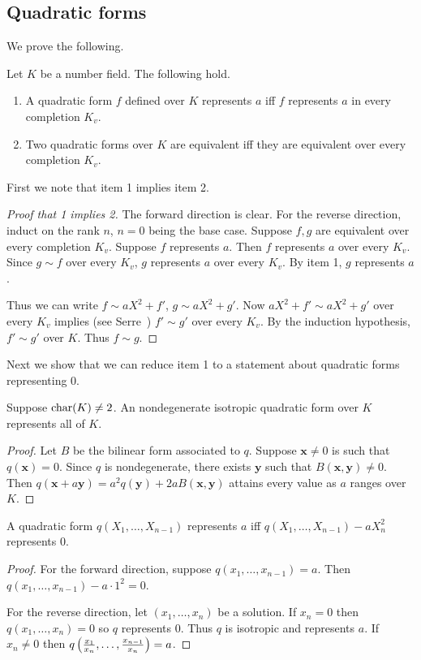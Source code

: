\subsection{Quadratic forms}
We prove the following.
\begin{thm}
Let $K$ be a number field. The following hold.
\begin{enumerate}
\item A quadratic form $f$ defined over $K$ represents $a$ iff $f$ represents $a$ in every completion $K_v$.
\item Two quadratic forms over $K$ are equivalent iff they are equivalent over every completion $K_v$.
\end{enumerate}
\end{thm}
First we note that item 1 implies item 2.
\begin{proof}[Proof that 1 implies 2]
The forward direction is clear. For the reverse direction, induct on the rank $n$, $n=0$ being the base case. Suppose $f,g$ are equivalent over every completion $K_v$. Suppose $f$ represents $a$. Then $f$ represents $a$ over every $K_v$. Since $g\sim f$ over every $K_v$, $g$ represents $a$ over every $K_v$. By item 1, $g$ represents $a$.

Thus we can write $f\sim aX^2+f'$, $g\sim aX^2+g'$. Now $aX^2+f'\sim aX^2+g'$ over every $K_v$ implies (see Serre~\cite[IV.1.7, Prop. 4]{Se73}) $f'\sim g'$ over every $K_v$. By the induction hypothesis, $f'\sim g'$ over $K$. Thus $f\sim g$.
\end{proof}
Next we show that we can reduce item 1 to a statement about quadratic forms representing 0. 
\begin{lem}
Suppose $\operatorname{char}(K)\ne 2$. 
An nondegenerate isotropic quadratic form over $K$ represents all of $K$.
\end{lem}
\begin{proof}
Let $B$ be the bilinear form associated to $q$. 
Suppose $\mathbf x\ne 0$ is such that $q(\mathbf x)=0$. Since $q$ is nondegenerate, there exists $\mathbf y$ such that $B(\mathbf x,\mathbf y)\ne 0$. Then $q(\mathbf x+a\mathbf y)=a^2 q(\mathbf y)+2aB(\mathbf x,\mathbf y)$ attains every value as $a$ ranges over $K$.
\end{proof}
\begin{lem}
A quadratic form $q(X_1,\ldots, X_{n-1})$ represents $a$ iff $q(X_1,\ldots, X_{n-1})-aX_n^2$ represents 0.
\end{lem}
\begin{proof}
For the forward direction, suppose $q(x_1,\ldots, x_{n-1})=a$. Then $q(x_1,\ldots, x_{n-1})-a\cdot 1^2=0$. 

For the reverse direction, let $(x_1,\ldots, x_n)$ be a solution. If $x_n=0$ then $q(x_1,\ldots, x_n)=0$ so $q$ represents 0. Thus $q$ is isotropic and represents $a$. If $x_{n}\ne 0$ then $q\left( {\frac{x_1}{x_n},\ldots, \frac{x_{n-1}}{x_n}} \right)=a$.
\end{proof}
